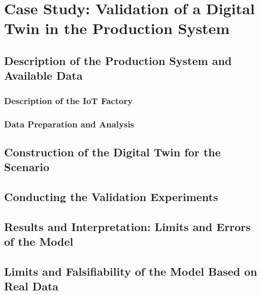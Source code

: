 \chapter{Case Study: Validation of a Digital Twin in the Production System}
\label{chap:case-study}

\section{Description of the Production System and Available Data}
\subsection{Description of the IoT Factory}
\subsection{Data Preparation and Analysis}

\section{Construction of the Digital Twin for the Scenario}

\section{Conducting the Validation Experiments}

\section{Results and Interpretation: Limits and Errors of the Model}

\section{Limits and Falsifiability of the Model Based on Real Data}
